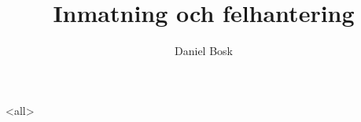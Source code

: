 \documentclass[ignoreframetext]{beamer}
\begin{document}
\title{%
  Inmatning och felhantering
}
\author{Daniel Bosk}

\begin{frame}
  \maketitle
\end{frame}

\mode<all>

\mode*
\end{document}
